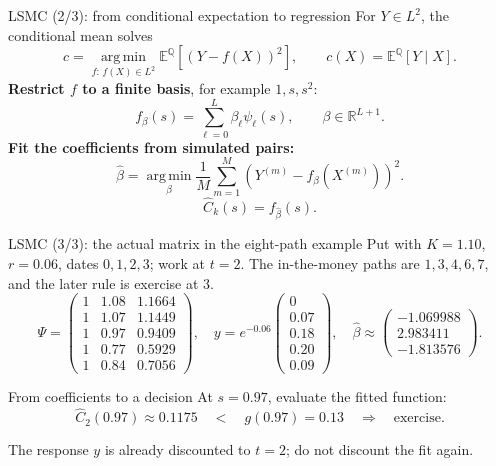 \documentclass[handout,10pt,aspectratio=169]{beamer}
\newcommand{\E}{\mathbb E}
\newcommand{\Q}{\mathbb Q}
\begin{document}
\begin{frame}{LSMC (2/3): from conditional expectation to regression}
\small
For \(Y\in L^2\), the conditional mean solves
\[
\boxed{c=\operatorname*{arg\,min}_{f:\,f(X)\in L^2}
\E^\Q[(Y-f(X))^2],}
\qquad c(X)=\E^\Q[Y\mid X].
\]
\textbf{Restrict \(f\) to a finite basis}, for example \(1,s,s^2\):
\[
f_\beta(s)=\sum_{\ell=0}^L\beta_\ell\psi_\ell(s),\qquad
\beta\in\mathbb R^{L+1}.
\]
\textbf{Fit the coefficients from simulated pairs:}
\[
\widehat\beta=\operatorname*{arg\,min}_{\beta}\frac1M\sum_{m=1}^M
\left(Y^{(m)}-f_\beta(X^{(m)})\right)^2.
\]
\[
\boxed{\widehat C_k(s)=f_{\widehat\beta}(s).}
\]
\end{frame}

\begin{frame}{LSMC (3/3): the actual matrix in the eight-path example}
\small
Put with \(K=1.10\), \(r=0.06\), dates \(0,1,2,3\); work at \(t=2\).
The in-the-money paths are \(1,3,4,6,7\), and the later rule is exercise at \(3\).
\[
\Psi=\begin{pmatrix}
1&1.08&1.1664\\
1&1.07&1.1449\\
1&0.97&0.9409\\
1&0.77&0.5929\\
1&0.84&0.7056
\end{pmatrix},\quad
y=e^{-0.06}\begin{pmatrix}0\\0.07\\0.18\\0.20\\0.09\end{pmatrix},\quad
\widehat\beta\approx\begin{pmatrix}-1.069988\\2.983411\\-1.813576\end{pmatrix}.
\]
\begin{exampleblock}{From coefficients to a decision}
At \(s=0.97\), evaluate the fitted function:
\[
\widehat C_2(0.97)\approx0.1175
\quad<\quad g(0.97)=0.13\quad\Longrightarrow\quad\text{exercise}.
\]
\end{exampleblock}
The response \(y\) is already discounted to \(t=2\); do not discount the fit again.
\end{frame}
\end{document}
